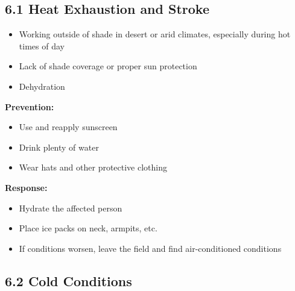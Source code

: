 \documentclass[
  11pt,
  letterpaper,
]{article}
\providecommand{\tightlist}{%
  \setlength{\itemsep}{0pt}\setlength{\parskip}{0pt}}
\begin{document}
\subsection{6.1 Heat Exhaustion and
Stroke}\label{heat-exhaustion-and-stroke}

\begin{tcolorbox}[enhanced jigsaw, colback=white, titlerule=0mm, leftrule=.75mm, left=2mm, toptitle=1mm, rightrule=.15mm, title=\textcolor{quarto-callout-warning-color}{\faExclamationTriangle}\hspace{0.5em}{Risk Factors}, opacitybacktitle=0.6, bottomrule=.15mm, breakable, opacityback=0, colframe=quarto-callout-warning-color-frame, coltitle=black, arc=.35mm, bottomtitle=1mm, colbacktitle=quarto-callout-warning-color!10!white, toprule=.15mm]

\begin{itemize}
\tightlist
\item
  Working outside of shade in desert or arid climates, especially during
  hot times of day
\item
  Lack of shade coverage or proper sun protection
\item
  Dehydration
\end{itemize}

\end{tcolorbox}

\textbf{Prevention:}

\begin{itemize}
\tightlist
\item
  Use and reapply sunscreen
\item
  Drink plenty of water
\item
  Wear hats and other protective clothing
\end{itemize}

\textbf{Response:}

\begin{itemize}
\tightlist
\item
  Hydrate the affected person
\item
  Place ice packs on neck, armpits, etc.
\item
  If conditions worsen, leave the field and find air-conditioned
  conditions
\end{itemize}

\subsection{6.2 Cold Conditions}\label{cold-conditions}
\end{document}
